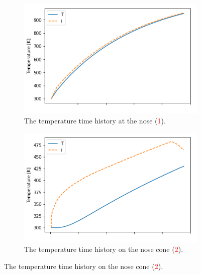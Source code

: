 \begin{figure}[!ht]
	\begin{subfigure}{.495\textwidth}
		\centering
		\includegraphics[width=0.99\linewidth]{figures/A1_uncertainty-analysis/TNose3}
		\caption{The temperature time history at the nose (\textcolor{red}{1}).}
		
	\end{subfigure}
	
	\begin{subfigure}{.495\textwidth}
		\centering
		\includegraphics[width=0.99\linewidth]{figures/A1_uncertainty-analysis/T3onNose}
		\caption{The temperature time history on the nose cone (\textcolor{red}{2}).}
		
	\end{subfigure}
	

\end{figure}
